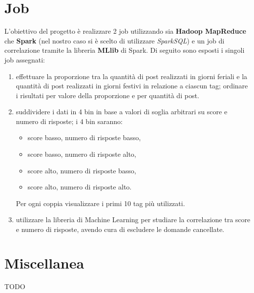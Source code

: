 \documentclass[
  a4paper,            %
  10pt                %
]{article}
\begin{document}
  \section{Job}\label{sec:job}

  L'obiettivo del progetto è realizzare 2 job utilizzando sia \textbf{Hadoop MapReduce} che \textbf{Spark} (nel nostro caso si è scelto di utilizzare \textit{SparkSQL})
  e un job di correlazione tramite la libreria \textbf{MLlib} di Spark.
  Di seguito sono esposti i singoli job assegnati:

  \begin{enumerate}
    \item
      effettuare la proporzione tra la quantità di post realizzati in giorni feriali e la quantità di post realizzati in giorni festivi in relazione a ciascun tag;
      ordinare i risultati per valore della proporzione e per quantità di post.

    \item
      suddividere i dati in 4 bin in base a valori di soglia arbitrari su score e numero di risposte; i 4 bin saranno:
      \begin{itemize}
        \item score basso, numero di risposte basso,
        \item score basso, numero di risposte alto,
        \item score alto, numero di risposte basso,
        \item score alto, numero di risposte alto.
      \end{itemize}
      Per ogni coppia visualizzare i primi 10 tag più utilizzati.

    \item
      utilizzare la libreria di Machine Learning per studiare la correlazione tra score e numero di risposte, avendo cura di escludere le domande cancellate.
  \end{enumerate}

  
  
  

  \section{Miscellanea}\label{sec:miscellaneous}

  TODO
\end{document}
